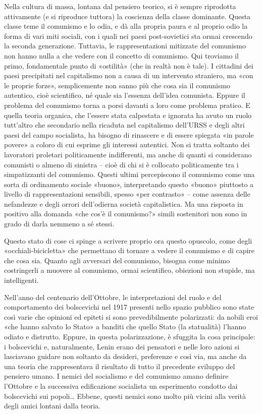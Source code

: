 \documentclass[../main]{subfiles}
\begin{document}
Nella cultura di massa, lontana dal pensiero teorico, si è sempre riprodotta attivamente (e si riproduce tuttora) la coscienza della classe dominante. Questa classe teme il comunismo e lo odia, e dà alla propria paura e al proprio odio la forma di vari miti sociali, con i quali nei paesi post-sovietici sta ormai crescendo la seconda generazione. Tuttavia, le rappresentazioni mitizzate del comunismo non hanno nulla a che vedere con il concetto di comunismo. Qui troviamo il primo, fondamentale punto di «ostilità» (che in realtà non è tale). I cittadini dei paesi precipitati nel capitalismo non a causa di un intervento straniero, ma «con le proprie forze», semplicemente non sanno più che cosa sia il comunismo autentico, cioè scientifico, né quale sia l'essenza dell'idea comunista. Eppure il problema del comunismo torna a porsi davanti a loro come problema pratico. E quella teoria organica, che l'essere stata calpestata e ignorata ha avuto un ruolo tutt'altro che secondario nella ricaduta nel capitalismo dell'URSS e degli altri paesi del campo socialista, ha bisogno di rinascere e di essere spiegata «in parole povere» a coloro di cui esprime gli interessi autentici. Non si tratta soltanto dei lavoratori proletari politicamente indifferenti, ma anche di quanti si considerano comunisti o almeno di sinistra – cioè di chi si è collocato politicamente tra i simpatizzanti del comunismo. Questi ultimi percepiscono il comunismo come una sorta di ordinamento sociale «buono», interpretando questo «buono» piuttosto a livello di rappresentazioni sensibili, spesso «per contrasto» – come assenza delle nefandezze e degli orrori dell'odierna società capitalistica. Ma una risposta in positivo alla domanda «che cos'è il comunismo?» simili sostenitori non sono in grado di darla nemmeno a sé stessi.

Questo stato di cose ci spinge a scrivere proprio ora questo opuscolo, come degli «occhiali-bicicletta» che permettano di tornare a vedere il comunismo e di capire che cosa sia. Quanto agli avversari del comunismo, bisogna come minimo costringerli a muovere al comunismo, ormai scientifico, obiezioni non stupide, ma intelligenti.

Nell'anno del centenario dell'Ottobre, le interpretazioni del ruolo e del comportamento dei bolscevichi nel 1917 presenti nello spazio pubblico sono state così varie che opinioni ed epiteti si sono prevedibilmente polarizzati: da nobili eroi «che hanno salvato lo Stato» a banditi che quello Stato (la statualità) l'hanno odiato e distrutto. Eppure, in questa polarizzazione, è sfuggita la cosa principale: i bolscevichi e, naturalmente, Lenin erano dei pensatori e nelle loro azioni si lasciavano guidare non soltanto da desideri, preferenze e così via, ma anche da una teoria che rappresentava il risultato di tutto il precedente sviluppo del pensiero umano. I nemici del socialismo e del comunismo amano definire l'Ottobre e la successiva edificazione socialista un esperimento condotto dai bolscevichi sui popoli… Ebbene, questi nemici sono molto più vicini alla verità degli amici lontani dalla teoria.
\end{document}
